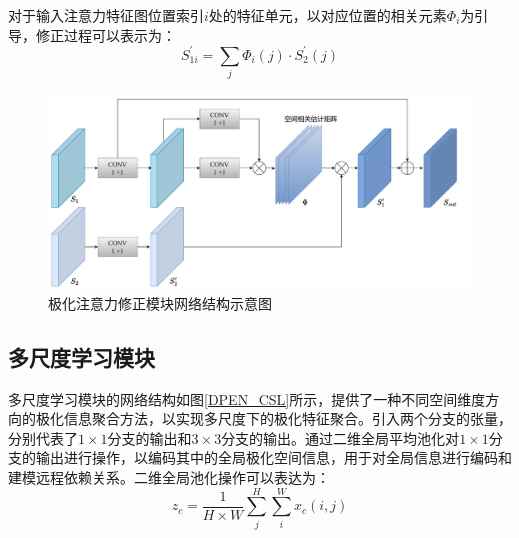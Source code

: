 对于输入注意力特征图位置索引$i$处的特征单元，以对应位置的相关元素$\Phi_i$为引导，修正过程可以表示为：
\begin{equation}
    S_{1i}^{\prime}=\sum_j{\Phi _i\left( j \right) \cdot S_{2}^{\prime}\left( j \right)}
\end{equation}




\begin{figure}[h]
    \centering
    \includegraphics[width=14cm]{pic/chapter3/极化注意力修正.pdf}
    \caption{极化注意力修正模块网络结构示意图}
    \label{DPEN_WFM}
\end{figure}


\subsection{多尺度学习模块}
\label{sec:多尺度学习模块}
多尺度学习模块的网络结构如图\ref{DPEN_CSL}所示，提供了一种不同空间维度方向的极化信息聚合方法，以实现多尺度下的极化特征聚合。引入两个分支的张量，分别代表了$1\times 1$分支的输出和$3 \times 3$分支的输出。通过二维全局平均池化对$1\times 1$分支的输出进行操作，以编码其中的全局极化空间信息，用于对全局信息进行编码和建模远程依赖关系。二维全局池化操作可以表达为：
\begin{equation}
    z_c=\frac{1}{H\times W}\sum_{j}^{H}\sum_{i}^{W}x_c(i,j)
\end{equation}

